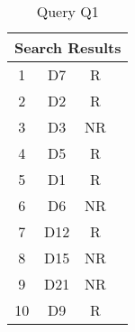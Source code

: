 \begin{table}[h]
 \centering
 \caption{Query Q1}
 \begin{tabular}{|c|c|c|c|}
  \hline
  \multicolumn{4}{|c|}{\textbf{Search Results}} \\
  \hline
  1  & D7  & R  & \\
  2  & D2  & R  & \\
  3  & D3  & NR & \\
  4  & D5  & R  & \\
  5  & D1  & R  & \\
  6  & D6  & NR & \\
  7  & D12 & R  & \\
  8  & D15 & NR & \\
  9  & D21 & NR & \\
  10 & D9  & R  & \\
  \hline
  \hline
 \end{tabular}
\end{table}
